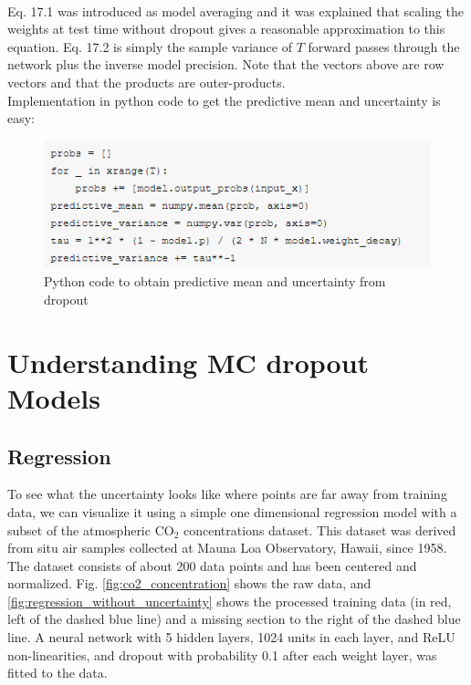\\
Eq. 17.1 was introduced as model averaging and it was explained that scaling the weights at test time without dropout gives a reasonable approximation to this equation. Eq. 17.2 is simply the sample variance of $T$ forward passes through the network plus the inverse model precision. Note that the vectors above are row vectors and that the products are outer-products.
\\
Implementation in python code to get the predictive mean and uncertainty is easy:
\begin{figure}[H]
    \centering
    \includegraphics[width=\textwidth]{labs/12/images/python code of getting mean and var.PNG}
    \caption{Python code to obtain predictive mean and uncertainty from dropout}
    \label{fig:visual_caption}
\end{figure}

\section{Understanding MC dropout Models}
\subsection{Regression}
To see what the uncertainty looks like where points are far away from training data, we can visualize it using a simple one dimensional regression model with a subset of the atmospheric CO$_2$ concentrations dataset. This dataset was derived from situ air samples collected at Mauna Loa Observatory, Hawaii, since 1958. The dataset consists of about 200 data points and has been centered and normalized. Fig. \ref{fig:co2_concentration} shows the raw data, and \ref{fig:regression_without_uncertainty} shows the processed training data (in red, left of the dashed blue line) and a missing section to the right of the dashed blue line. A neural network with 5 hidden layers, 1024 units in each layer, and ReLU non-linearities, and dropout with probability 0.1 after each weight layer, was fitted to the data.

